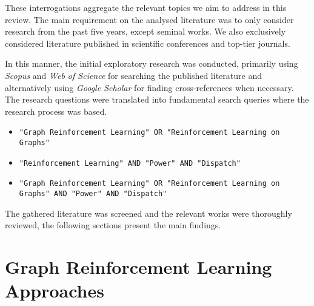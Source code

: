 These interrogations aggregate the relevant topics we aim to address in this review. The main requirement on the analysed literature was to only consider research from the past five years, except seminal works. We also exclusively considered literature published in scientific conferences and top-tier journals. \par
In this manner, the initial exploratory research was conducted, primarily using \textit{Scopus} and \textit{Web of Science} for searching the published literature and alternatively using \textit{Google Scholar} for finding cross-references when necessary. 
The research questions were translated into fundamental search queries where the research process was based.


\begin{itemize}
	\item \texttt{"Graph Reinforcement Learning" OR "Reinforcement Learning on Graphs"}
	\item \texttt{"Reinforcement Learning" AND "Power" AND "Dispatch"}
	\item \texttt{"Graph Reinforcement Learning" OR "Reinforcement Learning on Graphs" AND "Power" AND "Dispatch"}
\end{itemize}

 The gathered literature was screened and the relevant works were thoroughly reviewed, the following sections present the main findings.


\begin{comment}
	* Add literature histogram chart
\end{comment}



\section{Graph Reinforcement Learning Approaches} \label{sec:review-grl}

